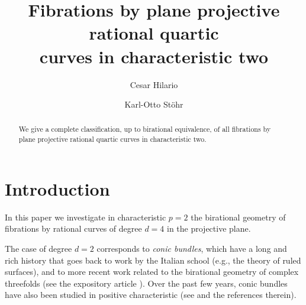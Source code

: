 \documentclass[12pt,reqno]{amsart}
\theoremstyle{definition}
\begin{document}
\title[Fibrations by non-smooth projective curves]{Fibrations by plane projective rational quartic \\ curves in characteristic two}

\author{Cesar Hilario}
\address{Mathematisches Institut, Heinrich-Heine-Universit\"at, 40204 D\"usseldorf, Germany}

\author{Karl-Otto Stöhr}
\address{IMPA, Estrada Dona Castorina 110, 22460-320 Rio de Janeiro, Brazil}






\begin{abstract}
We give a complete classification, up to birational equivalence, of all fibrations by plane projective rational quartic curves in characteristic two.
\end{abstract}

\maketitle

\section{Introduction}

\setcounter{tocdepth}{1}

In this paper we investigate in characteristic $p=2$ the birational geometry of fibrations by rational curves of degree $d=4$ in the projective plane.

The case of degree $d=2$ corresponds to \emph{conic bundles}, which have a long and rich history that goes back to work by the Italian school (e.g., the theory of ruled surfaces), and to more recent work related to the birational geometry of complex threefolds %
(see the expository article \cite{Pro18}).
Over the past few years, conic bundles have also been studied in positive characteristic
(see \cite{JVV24} and the references therein). 
\end{document}
